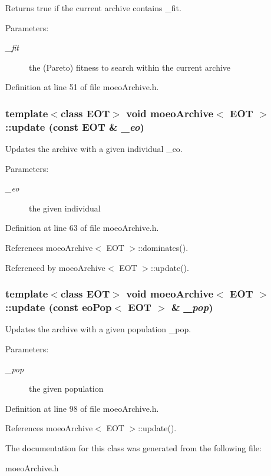 Returns true if the current archive contains \_\-fit. 

\begin{Desc}
\item[Parameters:]
\begin{description}
\item[{\em \_\-fit}]the (Pareto) fitness to search within the current archive \end{description}
\end{Desc}


Definition at line 51 of file moeo\-Archive.h.
\subsubsection{\setlength{\rightskip}{0pt plus 5cm}template$<$class EOT$>$ void {\bf moeo\-Archive}$<$ EOT $>$::update (const EOT \& {\em \_\-eo})\hspace{0.3cm}{\tt  [inline]}}\label{classmoeoArchive_be9f67bfe41c25537292056d5b30f56a}


Updates the archive with a given individual \_\-eo. 

\begin{Desc}
\item[Parameters:]
\begin{description}
\item[{\em \_\-eo}]the given individual \end{description}
\end{Desc}


Definition at line 63 of file moeo\-Archive.h.

References moeo\-Archive$<$ EOT $>$::dominates().

Referenced by moeo\-Archive$<$ EOT $>$::update().
\subsubsection{\setlength{\rightskip}{0pt plus 5cm}template$<$class EOT$>$ void {\bf moeo\-Archive}$<$ EOT $>$::update (const eo\-Pop$<$ EOT $>$ \& {\em \_\-pop})\hspace{0.3cm}{\tt  [inline]}}\label{classmoeoArchive_58e891ab400ba352e8b0a341d0bdc107}


Updates the archive with a given population \_\-pop. 

\begin{Desc}
\item[Parameters:]
\begin{description}
\item[{\em \_\-pop}]the given population \end{description}
\end{Desc}


Definition at line 98 of file moeo\-Archive.h.

References moeo\-Archive$<$ EOT $>$::update().

The documentation for this class was generated from the following file:\begin{CompactItemize}
\item 
moeo\-Archive.h\end{CompactItemize}
